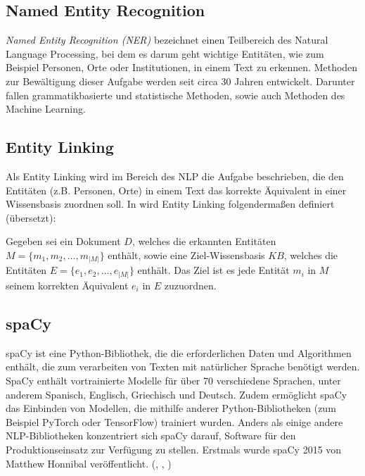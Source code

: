 \subsection{Named Entity Recognition}

\emph{Named Entity Recognition (\ac{NER})} bezeichnet einen Teilbereich des Natural Language Processing, bei dem es darum geht wichtige Entitäten, wie zum Beispiel Personen, Orte oder Institutionen, in einem Text zu erkennen. Methoden zur Bewältigung dieser Aufgabe werden seit circa 30 Jahren entwickelt. Darunter fallen grammatikbasierte und statistische Methoden, sowie auch Methoden des Machine Learning.

\subsection{Entity Linking}
Als Entity Linking wird im Bereich des NLP die Aufgabe beschrieben, die den Entitäten (z.B. Personen, Orte) in einem Text das korrekte Äquivalent in einer Wissensbasis zuordnen soll.
In \cite{shen_entity_2021} wird Entity Linking folgendermaßen definiert (übersetzt):
\begin{defn}
Gegeben sei ein Dokument $D$, welches die erkannten Entitäten $M=\{m_1, m_2, \dots, m_{|M|}\}$ enthält, sowie
eine Ziel-Wissensbasis $KB$, welches die Entitäten $E=\{e_1, e_2, \dots, e_{|M|}\}$ enthält. Das Ziel ist es 
jede Entität $m_i$ in $M$ seinem korrekten Äquivalent $e_i$ in $E$ zuzuordnen.
\end{defn}

\subsection{spaCy}
spaCy ist eine Python-Bibliothek, die die erforderlichen Daten und Algorithmen enthält, die zum verarbeiten von Texten mit natürlicher Sprache benötigt werden. SpaCy enthält vortrainierte Modelle für über 70 verschiedene Sprachen, unter anderem Spanisch, Englisch, Griechisch und Deutsch. Zudem ermöglicht spaCy das Einbinden von Modellen, die mithilfe anderer Python-Bibliotheken (zum Beispiel PyTorch oder TensorFlow) trainiert wurden.
Anders als einige andere NLP-Bibliotheken konzentriert sich spaCy darauf, Software für den Produktionseinsatz zur Verfügung zu stellen. Erstmals wurde spaCy 2015 von Matthew Honnibal veröffentlicht. (\cite{vasiliev2020natural}, \cite{github_spacy}, \cite{spacy})

